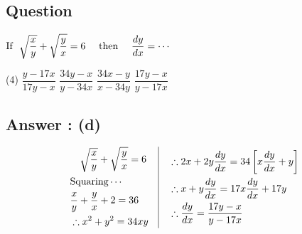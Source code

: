 \documentclass[17pt]{extarticle}
\begin{document}
\begin{fleqn}
\section{Question} 

$\begin{aligned}[t] 
\text{If \ } \sqrt{\frac{x}{y}} + \sqrt{\frac{y}{x}} = 6 \text{ \quad then \quad } \frac{dy}{dx} = \cdots
\end{aligned}$

\begin{tasks}(4)
  \task $\dfrac{y-17x}{17y-x}$ 
  \task $\dfrac{34y-x}{y-34x}$ 
  \task $\dfrac{34x-y}{x-34y}$ 
  \task $\dfrac{17y-x}{y-17x}$ 
\end{tasks}
\subsection*{Answer : (d)}
\begin{equation} \nonumber
\begin{alignedat}{4}
& \quad \sqrt{\frac{x}{y}} + \sqrt{\frac{y}{x}} = 6  \\
& \text{Squaring} \cdots \\
& \frac{x}{y} + \frac{y}{x} + 2= 36  \\
& \therefore x^2 + y^2 = 34xy \\
\end{alignedat}
\quad
\vrule
\quad
\begin{alignedat}{4}
& \therefore 2x + 2y \frac{dy}{dx} = 34\left[x\frac{dy}{dx} + y\right]\\
& \therefore x + y \frac{dy}{dx} = 17x\frac{dy}{dx} + 17y\\
& \therefore \frac{dy}{dx} = \frac{17y-x}{y-17x}\\
\end{alignedat}
\end{equation}


\end{fleqn}
\end{document}
